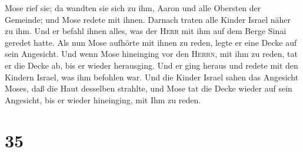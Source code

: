Mose rief sie; da wandten sie sich zu ihm, Aaron und alle Obersten der
Gemeinde; und Mose redete mit ihnen.  Darnach traten alle
Kinder Israel näher zu ihm. Und er befahl ihnen alles, was der
\textsc{Herr} mit ihm auf dem Berge Sinai geredet hatte. 
Als nun Mose aufhörte mit ihnen zu reden, legte er eine Decke auf sein
Angesicht.  Und wenn Mose hineinging vor den
\textsc{Herrn}, mit ihm zu reden, tat er die Decke ab, bis er wieder
herausging. Und er ging heraus und redete mit den Kindern Israel, was
ihm befohlen war.  Und die Kinder Israel sahen das
Angesicht Moses, daß die Haut desselben strahlte, und Mose tat die Decke
wieder auf sein Angesicht, bis er wieder hineinging, mit Ihm zu reden.

\hypertarget{section-34}{%
\section{35}\label{section-34}}

